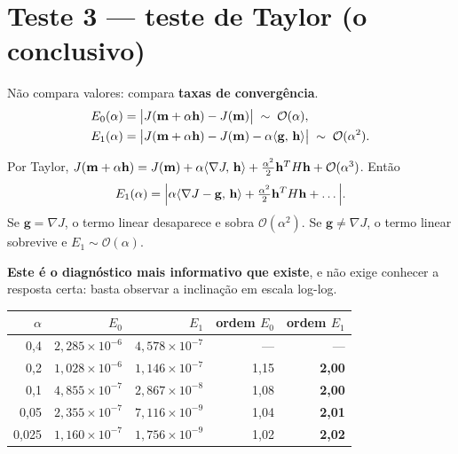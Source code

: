 \documentclass[11pt,a4paper,oneside]{report}
\begin{document}
\section{Teste 3 --- teste de Taylor (o conclusivo)}

N\~ao compara valores: compara \textbf{taxas de converg\^encia}.
\begin{align}
E_0(\alpha) &= \bigl|J(\mathbf{m}+\alpha\mathbf{h}) - J(\mathbf{m})\bigr|
 \;\sim\; \mathcal{O}(\alpha), \\
E_1(\alpha) &= \bigl|J(\mathbf{m}+\alpha\mathbf{h}) - J(\mathbf{m})
 - \alpha\langle \mathbf{g},\,\mathbf{h}\rangle\bigr|
 \;\sim\; \mathcal{O}(\alpha^{2}).
\end{align}

\begin{derivacao}
Por Taylor,
$J(\mathbf{m}+\alpha\mathbf{h}) = J(\mathbf{m})
 + \alpha\langle \nabla J,\,\mathbf{h}\rangle
 + \tfrac{\alpha^{2}}{2}\mathbf{h}^{T}H\mathbf{h} + \mathcal{O}(\alpha^{3})$.
Ent\~ao
\[
E_1(\alpha) = \Bigl|\alpha\langle \nabla J - \mathbf{g},\,\mathbf{h}\rangle
 + \tfrac{\alpha^{2}}{2}\mathbf{h}^{T}H\mathbf{h} + \dots\Bigr| .
\]
Se $\mathbf{g} = \nabla J$, o termo linear desaparece e sobra
$\mathcal{O}(\alpha^{2})$. Se $\mathbf{g} \ne \nabla J$, o termo linear
sobrevive e $E_1 \sim \mathcal{O}(\alpha)$.

\textbf{Este \'e o diagn\'ostico mais informativo que existe}, e n\~ao exige
conhecer a resposta certa: basta observar a inclina\c{c}\~ao em escala log-log.
\end{derivacao}

\begin{center}
\begin{tabular}{@{}rrrrr@{}}
\toprule
$\alpha$ & $E_0$ & $E_1$ & ordem $E_0$ & ordem $E_1$ \\
\midrule
0{,}4   & $2{,}285\times10^{-6}$ & $4{,}578\times10^{-7}$ & --- & --- \\
0{,}2   & $1{,}028\times10^{-6}$ & $1{,}146\times10^{-7}$ & 1{,}15 & \textbf{2{,}00} \\
0{,}1   & $4{,}855\times10^{-7}$ & $2{,}867\times10^{-8}$ & 1{,}08 & \textbf{2{,}00} \\
0{,}05  & $2{,}355\times10^{-7}$ & $7{,}116\times10^{-9}$ & 1{,}04 & \textbf{2{,}01} \\
0{,}025 & $1{,}160\times10^{-7}$ & $1{,}756\times10^{-9}$ & 1{,}02 & \textbf{2{,}02} \\
\bottomrule
\end{tabular}
\end{center}
\end{document}
